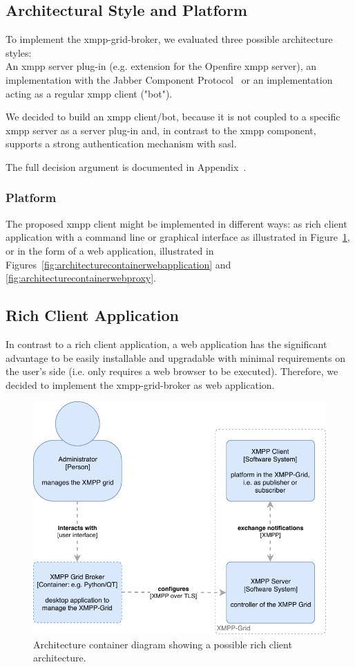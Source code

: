 \subsection{Architectural Style and Platform}

To implement the \gls{xmpp-grid-broker}, we evaluated three possible architecture styles:\hfill\\
An \gls{xmpp} server plug-in (e.g. extension for the Openfire \gls{xmpp} server), an implementation with the Jabber Component Protocol~\cite{xep-0114} or an implementation acting as a regular \gls{xmpp} client ("bot").

We decided to build an \gls{xmpp} client/bot, because it is not coupled to a specific \gls{xmpp} server as a server plug-in and, in contrast to the \gls{xmpp} component, supports a strong authentication mechanism with \gls{sasl}.

The full decision argument is documented in Appendix~.

\subsubsection{Platform}

The proposed \gls{xmpp} client might be implemented in different ways: as rich client application with a command line or graphical interface as illustrated in Figure~\ref{fig:architecturecontainerrichclient}, or in the form of a web application, illustrated in Figures~\ref{fig:architecturecontainerwebapplication} and \ref{fig:architecturecontainerwebproxy}.

\subsection{Rich Client Application}

In contrast to a rich client application, a web application has the significant advantage to be easily installable and upgradable with minimal requirements on the user's side (i.e. only requires a web browser to be executed).
Therefore, we decided to implement the \gls{xmpp-grid-broker} as web application.

\begin{figure}[h]
\centering
\includegraphics[width=0.7\linewidth]{resources/architecture_container_rich_client}
\caption[Architecture container diagram: Rich client]{Architecture container diagram showing a possible rich client architecture.}
\label{fig:architecturecontainerrichclient}
\end{figure}

